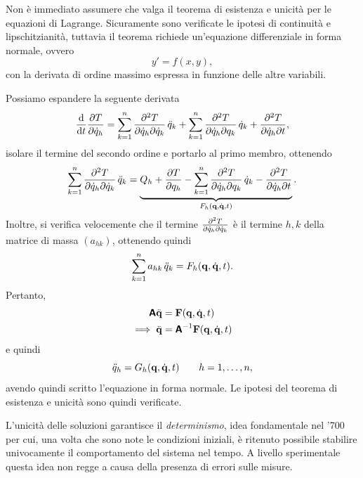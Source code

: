 Non è immediato assumere che valga il teorema di esistenza e unicità per le equazioni di Lagrange. Sicuramente sono verificate le ipotesi di continuità e lipschitzianità, tuttavia il teorema richiede un'equazione differenziale in forma normale, ovvero
\begin{equation*}
    y' = f(x, y),
\end{equation*}
con la derivata di ordine massimo espressa in funzione delle altre variabili.

Possiamo espandere la seguente derivata
\begin{equation*}
    \dv{t}\pdv{T}{\dot{q}_h} = \sum_{k=1}^n \pdv[2]{T}{\dot{q}_h}{\dot{q}_k}\,\ddot{q}_k + \sum_{k=1}^n \pdv[2]{T}{\dot{q}_h}{q_k}\,\dot{q}_k + \pdv[2]{T}{\dot{q}_h}{t},
\end{equation*}
isolare il termine del secondo ordine e portarlo al primo membro, ottenendo
\begin{equation*}
    \sum_{k=1}^n \pdv[2]{T}{\dot{q}_h}{\dot{q}_k}\,\ddot{q}_k = \underbrace{Q_h + \pdv{T}{q_h} - \sum_{k=1}^n \pdv[2]{T}{\dot{q}_h}{q_k}\,\dot{q}_k - \pdv[2]{T}{\dot{q}_h}{t}}_{F_h(\vb{q}, \dot{\vb{q}}, t)}.
\end{equation*}
Inoltre, si verifica velocemente che il termine $\pdv[2]{T}{\dot{q}_h}{\dot{q}_k}$ è il termine $h, k$ della matrice di massa $(a_{hk})$, ottenendo quindi
\begin{equation*}
    \sum_{k=1}^n a_{hk}\,\ddot{q}_k = F_h(\vb{q}, \dot{\vb{q}}, t).
\end{equation*}
Pertanto,
\begin{align*}
    \boldsymbol{\mathsf{A}} \ddot{\vb{q}} &= \vb{F}(\vb{q}, \dot{\vb{q}}, t) \\
    \implies \ddot{\vb{q}} &  = \boldsymbol{\mathsf{A}}^{-1} \vb{F}(\vb{q}, \dot{\vb{q}}, t)
\end{align*}
e quindi
\begin{equation*}
    \ddot{q}_h= G_h(\vb{q}, \dot{\vb{q}}, t) \qquad h = 1, \dots, n,
\end{equation*}
avendo quindi scritto l'equazione in forma normale. Le ipotesi del teorema di esistenza e unicità sono quindi verificate.

\begin{remark}
     L'unicità delle soluzioni garantisce il \emph{determinismo}, idea fondamentale nel '700 per cui, una volta che sono note le condizioni iniziali, è ritenuto possibile stabilire univocamente il comportamento del sistema nel tempo. A livello sperimentale questa idea non regge a causa della presenza di errori sulle misure.
\end{remark}

